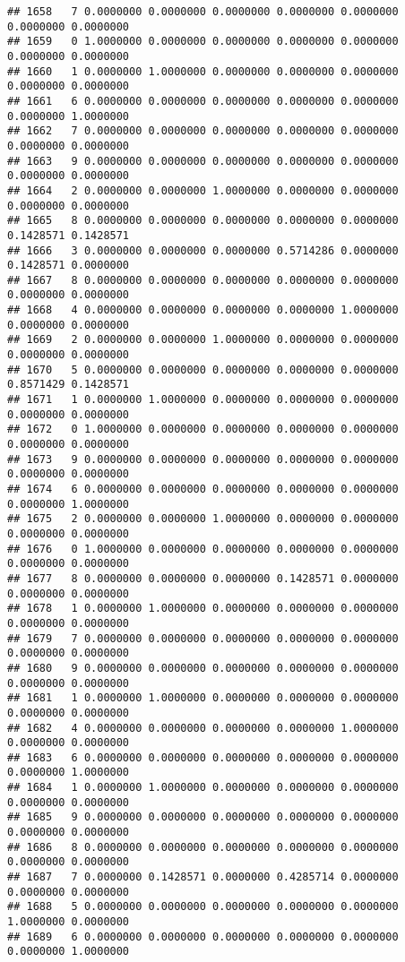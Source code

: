 \documentclass[
]{article}
\begin{document}
\begin{verbatim}
## 1658   7 0.0000000 0.0000000 0.0000000 0.0000000 0.0000000 0.0000000 0.0000000
## 1659   0 1.0000000 0.0000000 0.0000000 0.0000000 0.0000000 0.0000000 0.0000000
## 1660   1 0.0000000 1.0000000 0.0000000 0.0000000 0.0000000 0.0000000 0.0000000
## 1661   6 0.0000000 0.0000000 0.0000000 0.0000000 0.0000000 0.0000000 1.0000000
## 1662   7 0.0000000 0.0000000 0.0000000 0.0000000 0.0000000 0.0000000 0.0000000
## 1663   9 0.0000000 0.0000000 0.0000000 0.0000000 0.0000000 0.0000000 0.0000000
## 1664   2 0.0000000 0.0000000 1.0000000 0.0000000 0.0000000 0.0000000 0.0000000
## 1665   8 0.0000000 0.0000000 0.0000000 0.0000000 0.0000000 0.1428571 0.1428571
## 1666   3 0.0000000 0.0000000 0.0000000 0.5714286 0.0000000 0.1428571 0.0000000
## 1667   8 0.0000000 0.0000000 0.0000000 0.0000000 0.0000000 0.0000000 0.0000000
## 1668   4 0.0000000 0.0000000 0.0000000 0.0000000 1.0000000 0.0000000 0.0000000
## 1669   2 0.0000000 0.0000000 1.0000000 0.0000000 0.0000000 0.0000000 0.0000000
## 1670   5 0.0000000 0.0000000 0.0000000 0.0000000 0.0000000 0.8571429 0.1428571
## 1671   1 0.0000000 1.0000000 0.0000000 0.0000000 0.0000000 0.0000000 0.0000000
## 1672   0 1.0000000 0.0000000 0.0000000 0.0000000 0.0000000 0.0000000 0.0000000
## 1673   9 0.0000000 0.0000000 0.0000000 0.0000000 0.0000000 0.0000000 0.0000000
## 1674   6 0.0000000 0.0000000 0.0000000 0.0000000 0.0000000 0.0000000 1.0000000
## 1675   2 0.0000000 0.0000000 1.0000000 0.0000000 0.0000000 0.0000000 0.0000000
## 1676   0 1.0000000 0.0000000 0.0000000 0.0000000 0.0000000 0.0000000 0.0000000
## 1677   8 0.0000000 0.0000000 0.0000000 0.1428571 0.0000000 0.0000000 0.0000000
## 1678   1 0.0000000 1.0000000 0.0000000 0.0000000 0.0000000 0.0000000 0.0000000
## 1679   7 0.0000000 0.0000000 0.0000000 0.0000000 0.0000000 0.0000000 0.0000000
## 1680   9 0.0000000 0.0000000 0.0000000 0.0000000 0.0000000 0.0000000 0.0000000
## 1681   1 0.0000000 1.0000000 0.0000000 0.0000000 0.0000000 0.0000000 0.0000000
## 1682   4 0.0000000 0.0000000 0.0000000 0.0000000 1.0000000 0.0000000 0.0000000
## 1683   6 0.0000000 0.0000000 0.0000000 0.0000000 0.0000000 0.0000000 1.0000000
## 1684   1 0.0000000 1.0000000 0.0000000 0.0000000 0.0000000 0.0000000 0.0000000
## 1685   9 0.0000000 0.0000000 0.0000000 0.0000000 0.0000000 0.0000000 0.0000000
## 1686   8 0.0000000 0.0000000 0.0000000 0.0000000 0.0000000 0.0000000 0.0000000
## 1687   7 0.0000000 0.1428571 0.0000000 0.4285714 0.0000000 0.0000000 0.0000000
## 1688   5 0.0000000 0.0000000 0.0000000 0.0000000 0.0000000 1.0000000 0.0000000
## 1689   6 0.0000000 0.0000000 0.0000000 0.0000000 0.0000000 0.0000000 1.0000000

\end{verbatim}
\end{document}

